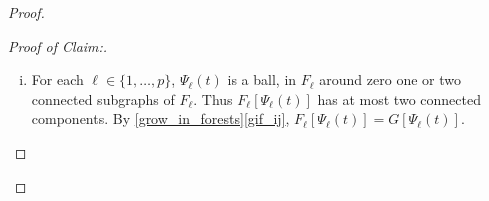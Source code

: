 \documentclass{patmorin}
\newcommand{\pat}[1]{\textcolor{Blue}{Pat: #1}}
\newcommand{\piotr}[1]{\textcolor{red}{Piotr: #1}}
\newenvironment{clmproof}{\begin{proof}[Proof of Claim:]\renewcommand{\qedsymbol}{\rule{1ex}{1ex}}}{\end{proof}}
\begin{document}
\begin{proof}
\begin{clmproof}
\begin{enumerate}[(i)]
    \item For each $\ell\in\{1,\ldots,p\}$, $\Psi_\ell(t)$ is a ball, in $F_\ell$ around zero one or two connected subgraphs of $F_\ell$.  Thus $F_\ell[\Psi_\ell(t)]$ has at most two connected components.  By \cref{grow_in_forests}\cref{gif_ij}, $F_\ell[\Psi_{\ell}(t)]=G[\Psi_{\ell}(t)]$. \qedhere
  \end{enumerate}
\end{clmproof}


\end{proof}
\end{document}
